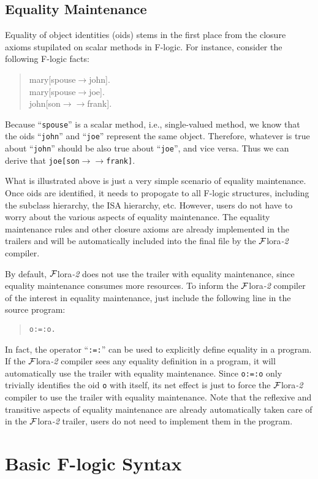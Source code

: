 \documentclass[11pt]{article}
\newcommand{\fd}{\ensuremath{{\rightarrow}}}                   %
\newcommand{\mvd}{\ensuremath{{\rightarrow\!\!\!\!\rightarrow}}}  %
\newcommand{\FLORA}{{\mbox{${\cal F}${\sc lora}\rm\emph{-2}}}\xspace}
\newcommand{\fl}{\mbox{F-logic}\xspace}
\begin{document}
\subsection{Equality Maintenance}


Equality of object identities (oids) stems in the first place from the
closure axioms stupilated on scalar methods in \fl. For instance, consider
the following \fl facts:
\begin{quote}
mary[spouse{\fd}john]. \\
mary[spouse{\fd}joe]. \\
john[son{\mvd}frank].
\end{quote}
Because ``{\tt spouse}'' is a scalar method, i.e., single-valued method,
we know that the oids ``{\tt john}'' and ``{\tt joe}'' represent
the same object. Therefore, whatever is true about ``{\tt john}'' should
be also true about ``{\tt joe}'', and vice versa. Thus we can derive
that {\tt joe[son{\mvd}frank]}.

What is illustrated above is just a very simple scenario of equality
maintenance. Once oids are identified, it needs to propogate to all
\fl structures, including the subclass hierarchy, the ISA hierarchy, etc.
However, users do not have to worry about the various aspects of equality
maintenance. The equality maintenance rules and other closure axioms
are already implemented in the trailers and will be automatically included
into the final file by the \FLORA compiler.

By default, \FLORA does not use the trailer with equality maintenance,
since equality maintenance consumes more resources. To inform the
\FLORA compiler of the interest in equality maintenance, just include
the following line in the source program:
\begin{quote}
\verb|o:=:o.|
\end{quote}
In fact, the operator ``{\tt :=:}'' can be used to explicitly define
equality in a program. If the \FLORA compiler sees any equality
definition in a program, it will automatically use the trailer with
equality maintenance. Since {\tt o:=:o} only trivially identifies
the oid {\tt o} with itself, its net effect is just to force the
\FLORA compiler to use the trailer with equality maintenance. Note
that the reflexive and transitive aspects of equality maintenance are
already automatically taken care of in the \FLORA trailer, users do
not need to implement them in the program.


\section{Basic \fl Syntax}
\end{document}
